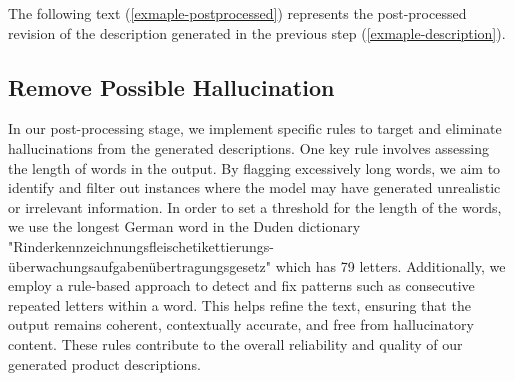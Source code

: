 The following text (\autoref{exmaple-postprocessed}) represents the post-processed revision of the description generated in the previous step (\autoref{exmaple-description}).

\begin{center}
	\par
\end{center}

\subsection{Remove Possible Hallucination}

In our post-processing stage, we implement specific rules to target and eliminate hallucinations from the generated descriptions. One key rule involves assessing the length of words in the output. By flagging excessively long words, we aim to identify and filter out instances where the model may have generated unrealistic or irrelevant information. In order to set a threshold for the length of the words, we use the longest German word in the Duden dictionary \cite{Ademi_2022} "Rinderkennzeichnungsfleischetikettierungs-überwachungsaufgabenübertragungsgesetz" which has 79 letters. Additionally, we employ a rule-based approach to detect and fix patterns such as consecutive repeated letters within a word. This helps refine the text, ensuring that the output remains coherent, contextually accurate, and free from hallucinatory content. These rules contribute to the overall reliability and quality of our generated product descriptions.

%
%

